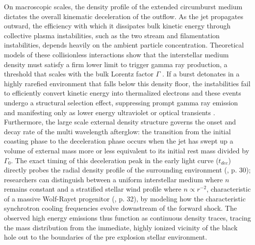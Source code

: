 \documentclass{aa} %
\begin{document}
On macroscopic scales, the density profile of the extended circumburst medium dictates the overall kinematic deceleration of the outflow. As the jet propagates outward, the efficiency with which it dissipates bulk kinetic energy through collective plasma instabilities, such as the two stream and filamentation instabilities, depends heavily on the ambient particle concentration. Theoretical models of these collisionless interactions show that the interstellar medium density must satisfy a firm lower limit to trigger gamma ray production, a threshold that scales with the bulk Lorentz factor $\Gamma$ \citep{Brainerd1999}. If a burst detonates in a highly rarefied environment that falls below this density floor, the instabilities fail to efficiently convert kinetic energy into thermalized electrons and these events undergo a structural selection effect, suppressing prompt gamma ray emission and manifesting only as lower energy ultraviolet or optical transients \citep{Brainerd1999}.
Furthermore, the large scale external density structure governs the onset and decay rate of the multi wavelength afterglow: the transition from the initial coasting phase to the deceleration phase occurs when the jet has swept up a volume of external mass more or less equivalent to its initial rest mass divided by $\Gamma_0$. The exact timing of this deceleration peak in the early light curve ($t_{dec}$) directly probes the radial density profile of the surrounding environment (\citet{KumarandZhang2015}, p. 30); researchers can distinguish between a uniform interstellar medium where $n$ remains constant and a stratified stellar wind profile where $n \propto r^{-2}$, characteristic of a massive Wolf-Rayet progenitor (\citet{KumarandZhang2015}, p. 32), by modeling how the characteristic synchrotron cooling frequencies evolve downstream of the forward shock. The observed high energy emissions thus function as continuous density traces, tracing the mass distribution from the immediate, highly ionized vicinity of the black hole out to the boundaries of the pre explosion stellar environment.
\end{document}
